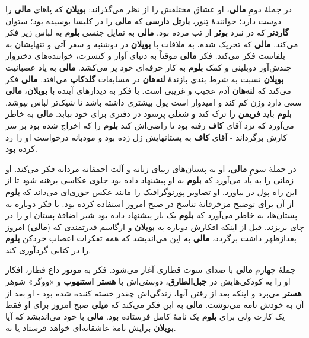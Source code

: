 \documentclass[12pt]{book}
\newcommand{\noun}[1]{{\textbf{#1}}}
\begin{document}
    در جملهٔ دومِ \noun{مالی}، او عشاق مختلفش را از نظر می‌گذراند: \noun{بویلان} که پاهای \noun{مالی} را دوست دارد؛ خوانندهٔ تِنور، \noun{بارتل دارسی} که \noun{مالی} را در کلیسا بوسیده بود؛ ستوان \noun{گاردنر} که در نبرد \noun{بوئر} از تب مرده بود. \noun{مالی} به تمایل جنسی \noun{بلوم} به لباس زیر فکر می‌کند. \noun{مالی} که تحریک شده، به ملاقات با \noun{بویلان} در دوشنبه و سفر آتی و تنهایشان به بلفاست فکر می‌کند. فکر \noun{مالی} موقتاً به دنیای آواز و کنسرت، خواننده‌های دختروار چندش‌آور دوبلینی و کمک \noun{بلوم} به کار حرفه‌ای خود پر می‌کشد. \noun{مالی} به یاد عصبانیت \noun{بویلان} نسبت به شرط بندی بازندهٔ \noun{لنه‌هان} در مسابقات \noun{گلدکاپ} می‌افتد. \noun{مالی} فکر می‌کند که \noun{لنه‌هان} آدم عجیب و غریبی است. با فکر به دیدارهای آینده با \noun{بویلان}، \noun{مالی} سعی دارد وزن کم کند و امیدوار است پول بیشتری داشته باشد تا شیک‌تر لباس بپوشد. \noun{بلوم} باید \noun{فریمن} را ترک کند و شغلی پرسود در دفتری برای خود بیابد. \noun{مالی} به خاطر می‌آورد که نزد آقای \noun{کاف} رفته بود تا راضی‌اش کند \noun{بلوم} را که اخراج شده بود بر سر کارش برگرداند - آقای \noun{کاف} به پستانهایش زل زده بود و مودبانه درخواست او را رد کرده بود.

    در جملهٔ سومِ \noun{مالی}، او به پستان‌های زیبای زنانه و آلت احمقانهٔ مردانه فکر می‌کند. او زمانی را به یاد می‌آورد که \noun{بلوم} به او پیشنهاد داده بود جلوی عکاسی برهنه شود تا از این راه پول در بیاورد. او تصاویر پورنوگرافیک را مانند عکس حوری‌ای می‌داند که \noun{بلوم} از آن برای توضیح مزخرفانهٔ تناسخ در صبح امروز استفاده کرده بود. با فکر دوباره به پستان‌ها، به خاطر می‌آورد که \noun{بلوم} یک بار پیشنهاد داده بود شیر اضافهٔ پستان او را در چای بریزند. قبل از اینکه افکارش دوباره به \noun{بویلان} و ارگاسم قدرتمندی که (\noun{مالی}) امروز بعدازظهر داشت برگردد، \noun{مالی} به این می‌اندیشد که همه تفکرات اعصاب خردکن \noun{بلوم} را در کتابی گردآوری کند.

    جملهٔ چهارم \noun{مالی} با صدای سوت قطاری آغاز می‌شود. فکر به موتور داغ قطار، افکار او را به کودکی‌هایش در \noun{جبل‌الطارق}، دوستی‌اش با \noun{هستر استنهوپ} و «ووگر» شوهر \noun{هستر} می‌برد و اینکه بعد از رفتن آنها، زندگی‌اش چقدر خسته کننده شده بود - او بعد از آن به خودش نامه می‌نوشت. \noun{مالی} به این فکر می‌کند که \noun{میلی} صبح امروز برای او فقط یک کارت ولی برای \noun{بلوم} یک نامهٔ کامل فرستاده بود. \noun{مالی} با خود می‌اندیشد که آیا \noun{بویلان} برایش نامهٔ عاشقانه‌ای خواهد فرستاد یا نه.
\end{document}
